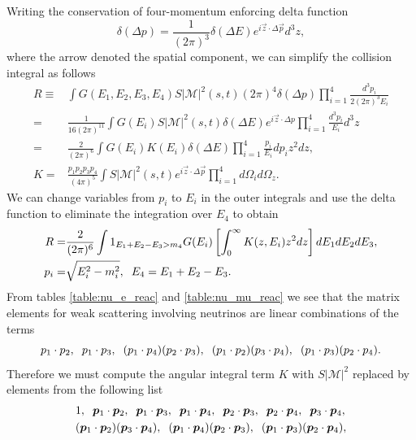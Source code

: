  Writing the conservation of four-momentum enforcing delta function
\begin{equation}
\delta(\Delta p)=\frac{1}{(2\pi)^3}\delta(\Delta E)e^{i\vec z\cdot \Delta \vec p}d^3z,
\end{equation}
where the arrow denoted the spatial component, we can simplify the collision integral as follows
\begin{align}
R\equiv&\int G(E_1,E_2,E_3,E_4) S|\mathcal{M}|^2(s,t)(2\pi)^4\delta(\Delta p)\prod_{i=1}^4\frac{d^3p_i}{2(2\pi)^3 E_i}\\
=&\frac{1}{16(2\pi)^{11}}\int G(E_i) S|\mathcal{M}|^2(s,t)\delta(\Delta E)e^{i\vec z\cdot\Delta p}\prod_{i=1}^4\frac{d^3p_i}{ E_i}d^3z\\
=&\frac{2}{(2\pi)^{6}}\int G(E_i)K(E_i) \delta(\Delta E)\prod_{i=1}^4\frac{p_i}{E_i}dp_i z^2dz,\\
K=&\frac{p_1p_2p_3p_4}{(4\pi)^5}\int S|\mathcal{M}|^2(s,t)e^{i\vec z\cdot\Delta\vec p}\prod_{i=1}^4d\Omega_id\Omega_z.
\end{align}
We can change variables from $p_i$ to $E_i$ in the outer integrals and use the delta function to eliminate the integration over $E_4$ to obtain
\begin{align}
R=&\frac{2}{(2\pi)^{6}}\int1_{E_1+E_2-E_3>m_4}G(E_i)\left[\int_0^\infty K(z,E_i)z^2dz\right]dE_1dE_2dE_3,\\
p_i=&\sqrt{E_i^2-m_i^2},\hspace{2mm} E_4=E_1+E_2-E_3.
\end{align}
From tables \ref{table:nu_e_reac} and \ref{table:nu_mu_reac} we see that the matrix elements for weak scattering involving neutrinos are linear combinations of the terms
\begin{equation}
p_1\cdot p_2,\hspace{2mm} p_1\cdot p_3,\hspace{2mm}(p_1\cdot p_4)(p_2\cdot p_3), \hspace{2mm} (p_1\cdot p_2)(p_3\cdot p_4),\hspace{2mm} (p_1\cdot p_3)(p_2\cdot p_4).
\end{equation}
Therefore we must compute the angular integral term $K$ with $S|\mathcal{M}|^2$ replaced by elements from the following list
\begin{align}\label{matrix_element_pieces}
&1,\hspace{2mm}\vec p_1 \cdot\vec p_2,\hspace{2mm}\vec p_1 \cdot\vec p_3,\hspace{2mm}\vec p_1 \cdot\vec p_4 ,\hspace{2mm}\vec p_2\cdot\vec p_3,\hspace{2mm}\vec p_2\cdot\vec p_4 ,\hspace{2mm}\vec p_3\cdot\vec p_4 ,\\
& (\vec p_1 \cdot\vec p_2)(\vec p_3\cdot\vec p_4 ),\hspace{2mm}(\vec p_1 \cdot\vec p_4 )(\vec p_2\cdot\vec p_3),\hspace{2mm} (\vec p_1 \cdot\vec p_3)(\vec p_2\cdot\vec p_4 ),
\end{align}
